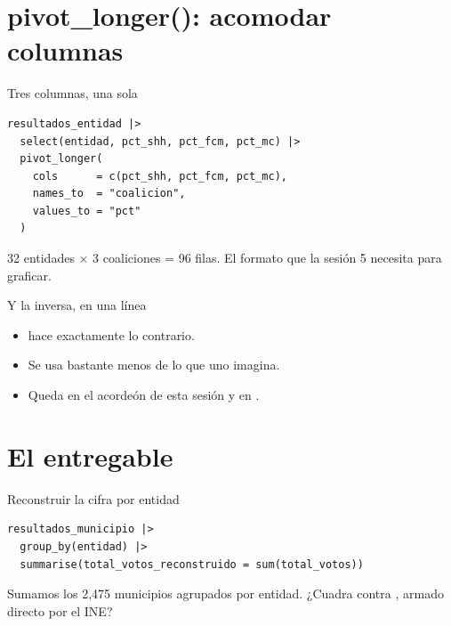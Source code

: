 \section{pivot\_longer(): acomodar columnas}

\begin{frame}[fragile]{Tres columnas, una sola}
\begin{lstlisting}
resultados_entidad |>
  select(entidad, pct_shh, pct_fcm, pct_mc) |>
  pivot_longer(
    cols      = c(pct_shh, pct_fcm, pct_mc),
    names_to  = "coalicion",
    values_to = "pct"
  )
\end{lstlisting}

  \vspace{0.5em}
  {\small 32 entidades × 3 coaliciones = 96 filas. El formato que la sesión
  5 necesita para graficar.}
\end{frame}

\begin{frame}{Y la inversa, en una línea}
  \vspace{0.4em}
  \begin{itemize}\setlength{\itemsep}{0.9em}
    \item<1->  hace exactamente lo contrario.
    \item<2-> Se usa bastante menos de lo que uno imagina.
    \item<3-> Queda en el acordeón de esta sesión y en .
  \end{itemize}
\end{frame}

\section{El entregable}

\begin{frame}[fragile]{Reconstruir la cifra por entidad}
\begin{lstlisting}
resultados_municipio |>
  group_by(entidad) |>
  summarise(total_votos_reconstruido = sum(total_votos))
\end{lstlisting}

  \vspace{0.6em}
  Sumamos los 2{,}475 municipios agrupados por entidad. ¿Cuadra contra
  , armado directo por el INE?
\end{frame}

